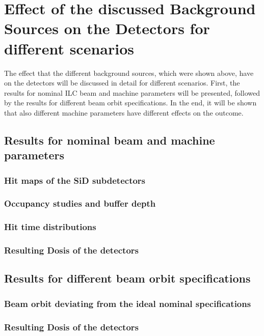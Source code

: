 \chapter{Effect of the discussed Background Sources on the Detectors for different scenarios}
\label{EffectDetectors}

The effect that the different background sources, which were shown above, have on the detectors will be discussed in detail for different scenarios.
First, the results for nominal ILC beam and machine parameters will be presented, followed by the results for different beam orbit specifications.
In the end, it will be shown that also different machine parameters have different effects on the outcome.

\section{Results for nominal beam and machine parameters}
\label{EffectDetectors:Nominal}
\subsection{Hit maps of the SiD subdetectors}
\label{EffectDetectors:hitmaps}
\subsection{Occupancy studies and buffer depth}
\label{EffectDetectors:occupancy}
\subsection{Hit time distributions}
\label{EffectDetectors:hittime}
\subsection{Resulting Dosis of the detectors}
\label{EffectDetectors:dosis}

\section{Results for different beam orbit specifications}
\label{EffectDetectors:BeamOrbit}

\subsection{Beam orbit deviating from the ideal nominal specifications}
\label{EffectDetectors:BeamOrbit:otherspecs}
\subsection{Resulting Dosis of the detectors}
\label{EffectDetectors:BeamOrbit:dosis}

